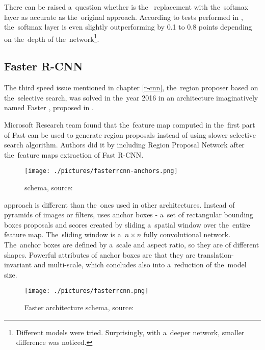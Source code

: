 There can be raised a~question whether is the~ replacement with
the~softmax layer as accurate as the~original approach. According to tests performed 
in \cite{fast-rcnn}, the~softmax layer is even slightly outperforming  
by 0.1 to 0.8  points depending on the~depth of
the~network\footnote{Different models were tried. Surprisingly, with a~deeper network, 
smaller  difference was noticed.}.

\subsection{Faster R-CNN}
\label{faster-rcnn}

The third speed issue mentioned in chapter \ref{r-cnn}, the~region proposer 
based on the~selective search, was solved in the~year 2016 in an architecture 
imaginatively named Faster , proposed in \cite{faster-rcnn}.

Microsoft Research team found that the~feature map computed in the~first part of 
Fast  can be used to generate region proposals instead of using slower 
selective search algorithm. Authors did it by including Region Proposal 
Network  after the~feature maps extraction of Fast R-CNN.

\begin{figure}[H]
   \centering
	\texttt{[image: ./pictures/fasterrcnn-anchors.png]}
	\caption[Region proposal network]{ schema, source: \cite{faster-rcnn}}
      \label{fig:rpn}
\end{figure}

 approach is different than the~ones used in other architectures. 
Instead of pyramids of images or filters,  uses anchor boxes - a~set of 
rectangular bounding boxes proposals and scores created by sliding a~spatial 
window over the~entire feature map. The~sliding window is a~$n \times n$ fully 
convolutional network. The~anchor boxes are defined by a~scale and aspect ratio, 
so they are of different shapes. Powerful attributes of anchor boxes are that 
they are translation-invariant and multi-scale, which concludes also into
a~reduction of the~model size.

\begin{figure}[H]
   \centering
	\texttt{[image: ./pictures/fasterrcnn.png]}
	\caption[Faster R-CNN architecture]{Faster  architecture schema, 
source: \cite{faster-rcnn}}
      \label{fig:faster-rcnn}
\end{figure}

